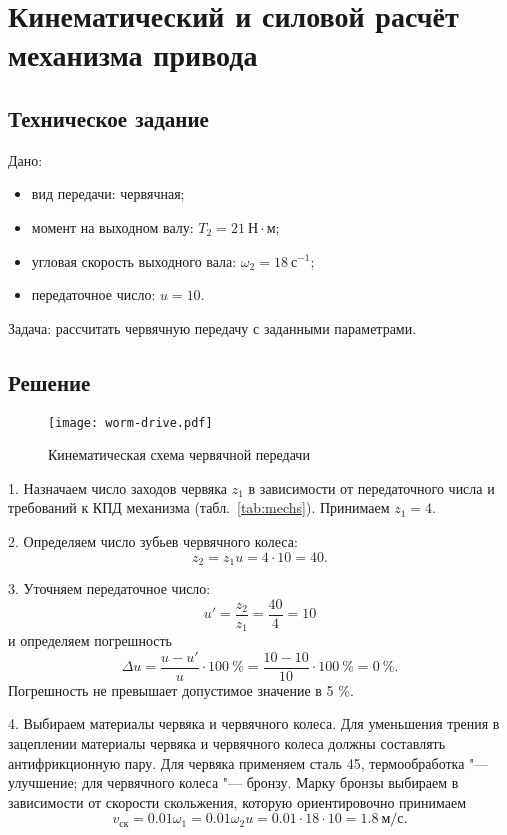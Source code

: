 \chapter{Кинематический и силовой расчёт механизма привода}

\section{Техническое задание}

Дано:
\begin{itemize}
    \item вид передачи: червячная;
    \item момент на выходном валу: $T_2 = 21~Н \cdot м$;
    \item угловая скорость выходного вала: $\omega_2 = 18~с^{-1}$;
    \item передаточное число: $u = 10$.
\end{itemize}

Задача: рассчитать червячную передачу с заданными параметрами.

\section{Решение}
\begin{wrapfigure}{l}{0.35\textwidth}
    \begin{center}
        \texttt{[image: worm-drive.pdf]}
        \caption{Кинематическая схема червячной передачи}
        \label{fig:worm-drive}
    \end{center}
\end{wrapfigure}

1. Назначаем число заходов червяка $z_1$ в зависимости от передаточного числа и требований к КПД механизма (табл.~\ref{tab:mechs}). Принимаем $z_1 = 4$.

2. Определяем число зубьев червячного колеса:
\[
    z_2 = z_1 u = 4 \cdot 10 = 40.
\]

3. Уточняем передаточное число:
\[
    u' = \frac{z_2}{z_1} = \frac{40}{4} = 10
\]
и определяем погрешность
\[
    \Delta u = \frac{u - u'}{u} \cdot 100~\%
             = \frac{10 - 10}{10} \cdot 100~\%
             = 0~\%.
\]
Погрешность не превышает допустимое значение в 5 \%.

4. Выбираем материалы червяка и червячного колеса.
Для уменьшения трения в зацеплении материалы червяка и червячного колеса должны составлять антифрикционную пару.
Для червяка применяем сталь 45, термообработка "--- улучшение; для червячного колеса "--- бронзу.
Марку бронзы выбираем в зависимости от скорости скольжения, которую ориентировочно принимаем
\[
    v_\text{ск} = 0.01 \omega_1 = 0.01 \omega_2 u = 0.01 \cdot 18 \cdot 10 = 1.8~м/с.
\]

